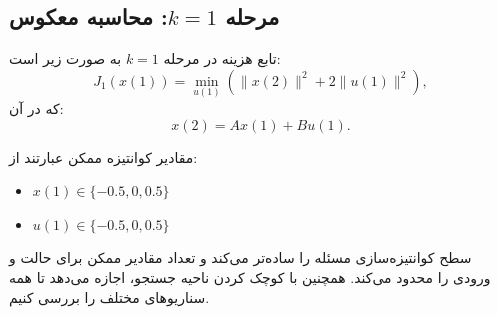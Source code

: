 \subsection*{مرحله \( k = 1 \): محاسبه معکوس}
تابع هزینه در مرحله \( k = 1 \) به صورت زیر است:
\[
J_1(x(1)) = \min_{u(1)} \left( \|x(2)\|^2 + 2\|u(1)\|^2 \right),
\]
که در آن:
\[
x(2) = A x(1) + B u(1).
\]

مقادیر کوانتیزه ممکن عبارتند از:
\begin{itemize}
	\item \( x(1) \in \{-0.5, 0, 0.5\} \)
	\item \( u(1) \in \{-0.5, 0, 0.5\} \)
\end{itemize}

سطح کوانتیزه‌سازی مسئله را ساده‌تر می‌کند و تعداد مقادیر ممکن برای حالت و ورودی را محدود می‌کند. همچنین با کوچک کردن ناحیه جستجو، اجازه می‌دهد تا همه سناریوهای مختلف را بررسی کنیم.

